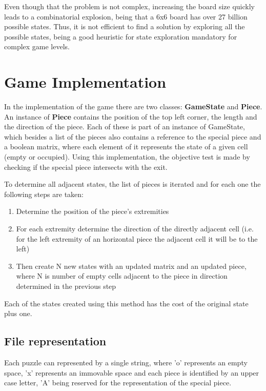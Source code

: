 \documentclass[conference]{IEEEtran}
\begin{document}
Even though that the problem is not complex, increasing the board size quickly leads to a combinatorial explosion, being that a 6x6 board has over 27 billion possible states. Thus, it is not efficient to find a solution by exploring all the possible states, being a good heuristic for state exploration mandatory for complex game levels.

\section{Game Implementation}

In the implementation of the game there are two classes: \textbf{GameState} and \textbf{Piece}. An instance of \textbf{Piece} contains the position of the top left corner, the length and the direction of the piece. Each of these is part of an instance of GameState, which besides a list of the pieces also contains a reference to the special piece and a boolean matrix, where each element of it represents the state of a given cell (empty or occupied). Using this implementation, the objective test is made by checking if the special piece intersects with the exit.

To determine all adjacent states, the list of pieces is iterated and for each one the following steps are taken:

\begin{enumerate}
    \item Determine the position of the piece's extremities
    \item For each extremity determine the direction of the directly adjacent cell (i.e. for the left extremity of an horizontal piece the adjacent cell it will be to the left)
    \item Then create N new states with an updated matrix and an updated piece, where N is number of empty cells adjacent to the piece in direction determined in the previous step
\end{enumerate}

Each of the states created using this method has the cost of the original state plus one.

\subsection{File representation}

Each puzzle can represented by a single string, where 'o' represents an empty space, 'x' represents an immovable space and each piece is identified by an upper case letter, 'A' being reserved for the representation of the special piece.
\end{document}
